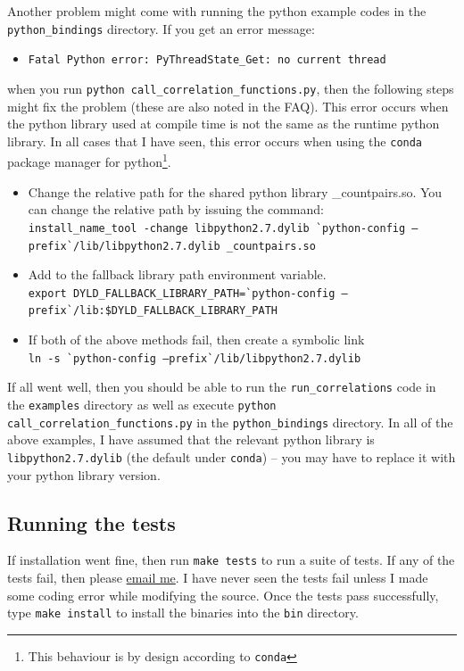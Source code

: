 \documentclass[12pt,titlepage,justified]{article}
\begin{document}
Another problem might come with running the python example codes in the \texttt{python\_bindings} directory. If you get an error message:
\begin{itemize} 
\item \texttt{Fatal Python error: PyThreadState\_Get: no current thread} 
\end{itemize}
when you run \texttt{python call\_correlation\_functions.py}, then the following 
steps might fix the problem (these are also noted in the FAQ). This error occurs when the python library used at compile time is not the same 
as the runtime python library. In all cases that I have seen, this error occurs when using the \texttt{conda} package manager for python\footnote{This 
behaviour is by design according to \texttt{conda}}. 
\begin{itemize}

\item Change the relative path for the shared python library \_countpairs.so. You can change the relative path by issuing the command: \\
{\scriptsize\texttt{install\_name\_tool -change libpython2.7.dylib  \`{}python-config --prefix\`{}/lib/libpython2.7.dylib \_countpairs.so}}

\item Add to the fallback library path environment variable. \\
{\scriptsize\texttt{export DYLD\_FALLBACK\_LIBRARY\_PATH=\`{}python-config --prefix\`{}/lib:\$DYLD\_FALLBACK\_LIBRARY\_PATH}}

\item If both of the above methods fail, then create a symbolic link \\
{\scriptsize\texttt{ln -s \`{}python-config --prefix\`{}/lib/libpython2.7.dylib}}
\end{itemize}
If all went well, then you should be able to run the \texttt{run\_correlations} code in the \texttt{examples} directory as well as execute \texttt{python call\_correlation\_functions.py} 
in the \texttt{python\_bindings} directory. In all of the above examples, I have assumed that the relevant python library is \texttt{libpython2.7.dylib} (the default 
under \texttt{conda}) -- you may have to replace it with your python library version.

\subsection{Running the tests}
If installation went fine, then run \texttt{make tests} to run a suite of tests. If any of the tests fail, then please \href{mailto:manodeep@gmail.com}{email me}. I have 
never seen the tests fail unless I made some coding error while modifying the source. 
Once the tests pass successfully, type \texttt{make install} to install the binaries into the \texttt{bin} directory. 
\end{document}
